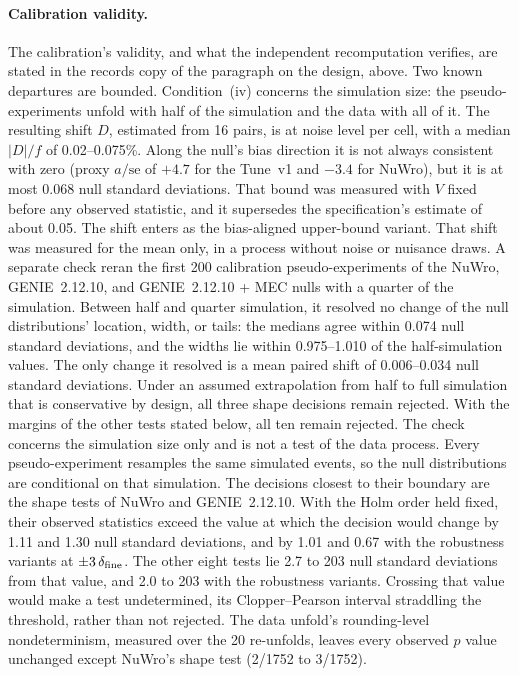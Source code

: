 \paragraph{Calibration validity.} The calibration's validity, and what the independent recomputation verifies, are stated in the records copy of the paragraph on the design, above. Two known departures are bounded. Condition~(iv) concerns the simulation size: the pseudo-experiments unfold with half of the simulation and the data with all of it. The resulting shift $D$, estimated from 16 pairs, is at noise level per cell, with a median $|D|/f$ of 0.02--0.075\%. Along the null's bias direction it is not always consistent with zero (proxy $a/\mathrm{se}$ of $+4.7$ for the Tune~v1 and $-3.4$ for NuWro), but it is at most 0.068 null standard deviations. That bound was measured with $V$ fixed before any observed statistic, and it supersedes the specification's estimate of about 0.05. The shift enters as the bias-aligned upper-bound variant. That shift was measured for the mean only, in a process without noise or nuisance draws. A separate check reran the first 200 calibration pseudo-experiments of the NuWro, GENIE~2.12.10, and GENIE~2.12.10 + MEC nulls with a quarter of the simulation. Between half and quarter simulation, it resolved no change of the null distributions' location, width, or tails: the medians agree within 0.074 null standard deviations, and the widths lie within 0.975--1.010 of the half-simulation values. The only change it resolved is a mean paired shift of 0.006--0.034 null standard deviations. Under an assumed extrapolation from half to full simulation that is conservative by design, all three shape decisions remain rejected. With the margins of the other tests stated below, all ten remain rejected. The check concerns the simulation size only and is not a test of the data process. Every pseudo-experiment resamples the same simulated events, so the null distributions are conditional on that simulation. The decisions closest to their boundary are the shape tests of NuWro and GENIE~2.12.10. With the Holm order held fixed, their observed statistics exceed the value at which the decision would change by 1.11 and 1.30 null standard deviations, and by 1.01 and 0.67 with the robustness variants at $\pm3\,\delta_{\mathrm{fine}}$. The other eight tests lie 2.7 to 203 null standard deviations from that value, and 2.0 to 203 with the robustness variants. Crossing that value would make a test undetermined, its Clopper--Pearson interval straddling the threshold, rather than not rejected. The data unfold's rounding-level nondeterminism, measured over the 20 re-unfolds, leaves every observed $p$ value unchanged except NuWro's shape test (2/1752 to 3/1752).
